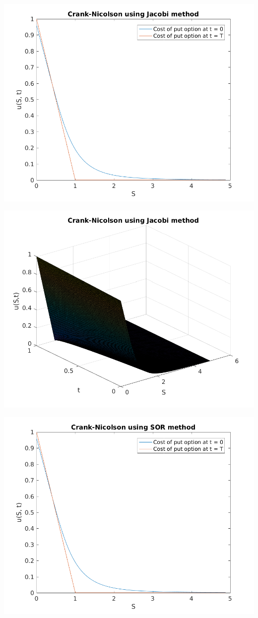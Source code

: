 \documentclass{article}
\begin{document}
\includegraphics{"q2_15"}
\pagebreak


\includegraphics{"q2_16"}
\pagebreak


\includegraphics{"q2_17"}
\pagebreak
\end{document}
